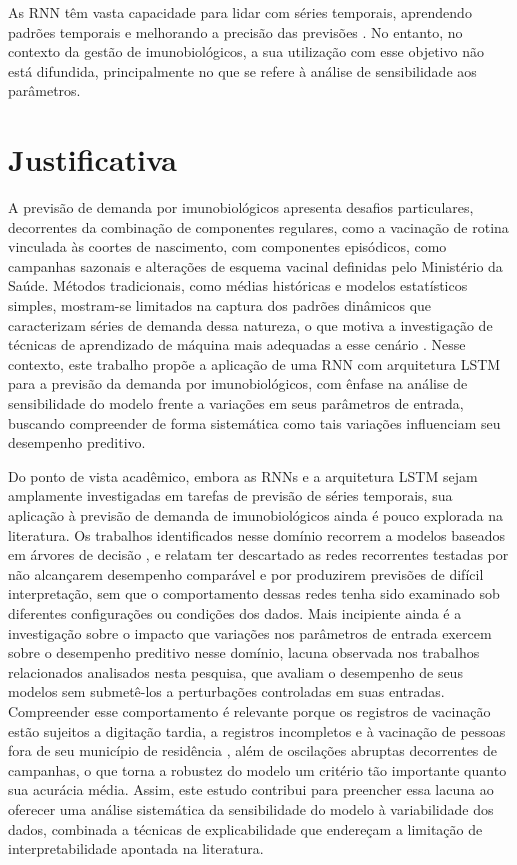 \documentclass[
    12pt,                %
    openright,           %
    oneside,             %
    a4paper,             %
    english,             %
    brazil               %
]{abntex2}
\begin{document}
As RNN têm vasta capacidade para lidar com séries temporais, aprendendo padrões temporais e melhorando a precisão das previsões . No entanto, no contexto da gestão de imunobiológicos, a sua utilização com esse objetivo não está difundida, principalmente no que se refere à análise de sensibilidade aos parâmetros.

\section{Justificativa}
\label{sec:justificativa}

A previsão de demanda por imunobiológicos apresenta desafios particulares, decorrentes da combinação de componentes regulares, como a vacinação de rotina vinculada às coortes de nascimento, com componentes episódicos, como campanhas sazonais e alterações de esquema vacinal definidas pelo Ministério da Saúde. Métodos tradicionais, como médias históricas e modelos estatísticos simples, mostram-se limitados na captura dos padrões dinâmicos que caracterizam séries de demanda dessa natureza, o que motiva a investigação de técnicas de aprendizado de máquina mais adequadas a esse cenário \cite{math14050838}. Nesse contexto, este trabalho propõe a aplicação de uma RNN com arquitetura LSTM para a previsão da demanda por imunobiológicos, com ênfase na análise de sensibilidade do modelo frente a variações em seus parâmetros de entrada, buscando compreender de forma sistemática como tais variações influenciam seu desempenho preditivo.

Do ponto de vista acadêmico, embora as RNNs e a arquitetura LSTM sejam amplamente investigadas em tarefas de previsão de séries temporais, sua aplicação à previsão de demanda de imunobiológicos ainda é pouco explorada na literatura. Os trabalhos identificados nesse domínio recorrem a modelos baseados em árvores de decisão \cite{Lopes2022}, e  relatam ter descartado as redes recorrentes testadas por não alcançarem desempenho comparável e por produzirem previsões de difícil interpretação, sem que o comportamento dessas redes tenha sido examinado sob diferentes configurações ou condições dos dados. Mais incipiente ainda é a investigação sobre o impacto que variações nos parâmetros de entrada exercem sobre o desempenho preditivo nesse domínio, lacuna observada nos trabalhos relacionados analisados nesta pesquisa, que avaliam o desempenho de seus modelos sem submetê-los a perturbações controladas em suas entradas. Compreender esse comportamento é relevante porque os registros de vacinação estão sujeitos a digitação tardia, a registros incompletos e à vacinação de pessoas fora de seu município de residência \cite{Lopes2022}, além de oscilações abruptas decorrentes de campanhas, o que torna a robustez do modelo um critério tão importante quanto sua acurácia média. Assim, este estudo contribui para preencher essa lacuna ao oferecer uma análise sistemática da sensibilidade do modelo à variabilidade dos dados, combinada a técnicas de explicabilidade que endereçam a limitação de interpretabilidade apontada na literatura.
\end{document}

